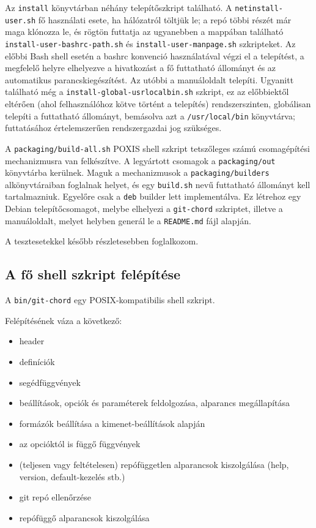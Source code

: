 \documentclass[
]{elteikthesis}[2025/03/25]
\begin{document}
Az \verb|install| könyvtárban néhány telepítőszkript található.
A \verb|netinstall-user.sh| fő használati esete, ha hálózatról töltjük le;
a repó többi részét már maga klónozza le,
és rögtön futtatja az ugyanebben a mappában található
\verb|install-user-bashrc-path.sh| és
\verb|install-user-manpage.sh| szkripteket.
Az előbbi Bash shell esetén a bashrc konvenció használatával végzi el a telepítést,
a megfelelő helyre elhelyezve a hivatkozást a fő futtatható állományt és az automatikus parancskiegészítést.
Az utóbbi a manuáloldalt telepíti.
Ugyanitt található még a \verb|install-global-usrlocalbin.sh| szkript,
ez az előbbiektől eltérően (ahol felhasználóhoz kötve történt a telepítés)
rendszerszinten, globálisan telepíti a futtatható állományt,
bemásolva azt a \verb|/usr/local/bin| könyvtárva;
futtatásához értelemszerűen rendszergazdai jog szükséges.

A \verb|packaging/build-all.sh| POXIS shell szkript tetszőleges számú csomagépítési mechanizmusra van felkészítve.
A legyártott csomagok a \verb|packaging/out| könyvtárba kerülnek.
Maguk a mechanizmusok a \verb|packaging/builders| alkönyvtáraiban foglalnak helyet,
és egy \verb|build.sh| nevű futtatható állományt kell tartalmazniuk.
Egyelőre csak a \verb|deb| builder lett implementálva.
Ez létrehoz egy Debian telepítőcsomagot, melybe elhelyezi a \verb|git-chord| szkriptet,
illetve a manuáloldalt, melyet helyben generál le a \verb|README.md| fájl alapján.

A tesztesetekkel később részletesebben foglalkozom.

\subsection{A fő shell szkript felépítése}

A \verb|bin/git-chord| egy POSIX-kompatibilis shell szkript.

Felépítésének váza a következő:

\begin{itemize}
    \item header
    \item definíciók
    \item segédfüggvények
    \item beállítások, opciók és paraméterek feldolgozása, alparancs megállapítása
    \item formázók beállítása a kimenet-beállítások alapján
    \item az opcióktól is függő függvények
    \item (teljesen vagy feltételesen) repófüggetlen alparancsok kiszolgálása (help, version, default-kezelés stb.)
    \item git repó ellenőrzése
    \item repófüggő alparancsok kiszolgálása
\end{itemize}
\end{document}
